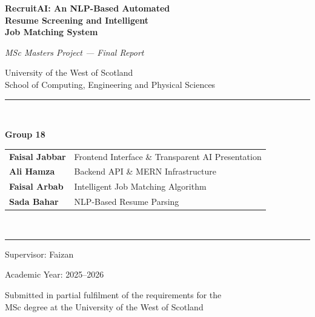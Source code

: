 \documentclass[12pt,a4paper]{report}
\begin{document}
\begin{titlepage}
  \centering
  \vspace*{2cm}
  {\Huge\bfseries\color{blue!70!black} RecruitAI: An NLP-Based Automated\\[0.4em]
  Resume Screening and Intelligent\\[0.4em] Job Matching System\par}
  \vspace{1.5cm}
  {\large\itshape MSc Masters Project — Final Report\par}
  \vspace{0.5cm}
  {\large University of the West of Scotland\\
  School of Computing, Engineering and Physical Sciences\par}
  \vspace{1.5cm}
  \rule{\linewidth}{0.4pt}\\[0.4em]
  {\large\bfseries Group 18\par}
  \vspace{0.5cm}
  \begin{tabular}{ll}
    \textbf{Faisal Jabbar}  & Frontend Interface \& Transparent AI Presentation \\
    \textbf{Ali Hamza}      & Backend API \& MERN Infrastructure \\
    \textbf{Faisal Arbab}   & Intelligent Job Matching Algorithm \\
    \textbf{Sada Bahar}     & NLP-Based Resume Parsing \\
  \end{tabular}\\[0.5em]
  \rule{\linewidth}{0.4pt}
  \vspace{1cm}
  {\large Supervisor: Faizan\par}
  {\large Academic Year: 2025--2026\par}
  \vfill
  {\small Submitted in partial fulfilment of the requirements for the\\
  MSc degree at the University of the West of Scotland}
\end{titlepage}
\end{document}
